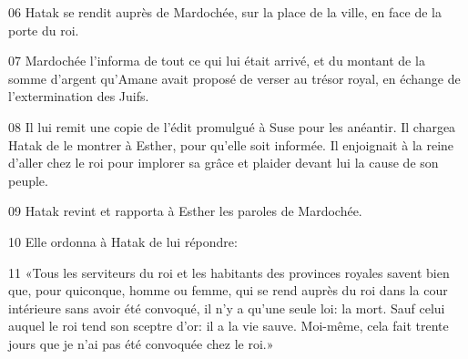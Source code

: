 
06 Hatak se rendit auprès de Mardochée, sur la place de la ville, en face de la porte du roi.

07 Mardochée l’informa de tout ce qui lui était arrivé, et du montant de la somme d’argent qu’Amane avait proposé de verser au trésor royal, en échange de l’extermination des Juifs.

08 Il lui remit une copie de l’édit promulgué à Suse pour les anéantir. Il chargea Hatak de le montrer à Esther, pour qu’elle soit informée. Il enjoignait à la reine d’aller chez le roi pour implorer sa grâce et plaider devant lui la cause de son peuple.

09 Hatak revint et rapporta à Esther les paroles de Mardochée.

10 Elle ordonna à Hatak de lui répondre:

11 «Tous les serviteurs du roi et les habitants des provinces royales savent bien que, pour quiconque, homme ou femme, qui se rend auprès du roi dans la cour intérieure sans avoir été convoqué, il n’y a qu’une seule loi: la mort. Sauf celui auquel le roi tend son sceptre d’or: il a la vie sauve. Moi-même, cela fait trente jours que je n’ai pas été convoquée chez le roi.»
